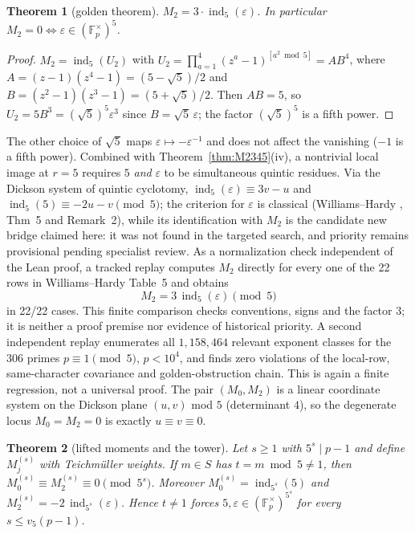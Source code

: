 \documentclass[11pt]{amsart}
\newtheorem{theorem}{Theorem}[section]
\theoremstyle{definition}
\theoremstyle{remark}
\newcommand{\F}{\mathbb{F}}
\newcommand{\eps}{\varepsilon}
\newcommand{\ind}{\operatorname{ind}}
\begin{document}
\begin{theorem}[golden theorem]\label{thm:golden}
$M_2 = 3 \cdot \ind_5(\eps)$. In particular $M_2 = 0 \iff \eps \in
(\F_p^\times)^5$.
\end{theorem}

\begin{proof}
$M_2 = \ind_5(U_2)$ with $U_2 = \prod_{a=1}^{4}(z^a-1)^{[a^2 \bmod 5]}
= A B^4$, where $A = (z-1)(z^4-1) = (5-\sqrt5)/2$ and
$B = (z^2-1)(z^3-1) = (5+\sqrt5)/2$. Then $AB = 5$, so
$U_2 = 5 B^3 = (\sqrt5)^5 \eps^3$ since $B = \sqrt5\,\eps$; the factor
$(\sqrt5)^5$ is a fifth power.
\end{proof}

The other choice of $\sqrt5$ maps $\eps \mapsto -\eps^{-1}$ and does not
affect the vanishing ($-1$ is a fifth power). Combined with
Theorem~\ref{thm:M2345}(iv), a nontrivial local image at $r = 5$ requires
$5$ \emph{and} $\eps$ to be simultaneous quintic residues. Via the Dickson
system of quintic cyclotomy, $\ind_5(\eps) \equiv 3v - u$ and $\ind_5(5)
\equiv -2u - v \pmod 5$; the criterion for $\eps$ is classical
(Williams--Hardy \cite{WH1985}, Thm~5 and Remark~2), while its
identification with $M_2$ is the candidate new bridge claimed here: it was
not found in the targeted search, and priority remains provisional pending
specialist review.  As a normalization check independent of the Lean proof,
a tracked replay computes \(M_2\) directly for every one of the 22 rows in
Williams--Hardy Table~5 and obtains
\[
  M_2 = 3\,\ind_5(\eps)\pmod 5
\]
in 22/22 cases.  This finite comparison checks conventions, signs and the
factor \(3\); it is neither a proof premise nor evidence of historical
priority.  A second independent replay enumerates all \(1{,}158{,}464\)
relevant exponent classes for the \(306\) primes
\(p\equiv1\pmod5\), \(p<10^4\), and finds zero violations of the local-row,
same-character covariance and golden-obstruction chain.  This is again a
finite regression, not a universal proof. The pair $(M_0, M_2)$ is a linear
coordinate system on the Dickson plane $(u,v)$ mod $5$ (determinant $4$), so
the degenerate locus $M_0 = M_2 = 0$ is exactly $u \equiv v \equiv 0$.

\begin{theorem}[lifted moments and the tower]\label{thm:tower-local}
Let $s \ge 1$ with $5^s \mid p - 1$ and define $M_j^{(s)}$ with Teichm\"uller
weights. If $m \in S$ has $t = m \bmod 5 \ne 1$, then
$M_0^{(s)} \equiv M_2^{(s)} \equiv 0 \pmod{5^s}$. Moreover
$M_0^{(s)} = \ind_{5^s}(5)$ and $M_2^{(s)} = -2\,\ind_{5^s}(\eps)$.
Hence $t \ne 1$ forces $5, \eps \in (\F_p^\times)^{5^s}$ for every
$s \le v_5(p-1)$.
\end{theorem}
\end{document}
